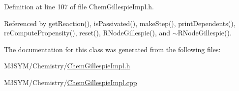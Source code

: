 Definition at line 107 of file Chem\+Gillespie\+Impl.\+h.



Referenced by get\+Reaction(), is\+Passivated(), make\+Step(), print\+Dependents(), re\+Compute\+Propensity(), reset(), R\+Node\+Gillespie(), and $\sim$\+R\+Node\+Gillespie().



The documentation for this class was generated from the following files\+:\begin{DoxyCompactItemize}
\item 
M3\+S\+Y\+M/\+Chemistry/\hyperlink{ChemGillespieImpl_8h}{Chem\+Gillespie\+Impl.\+h}\item 
M3\+S\+Y\+M/\+Chemistry/\hyperlink{ChemGillespieImpl_8cpp}{Chem\+Gillespie\+Impl.\+cpp}\end{DoxyCompactItemize}
